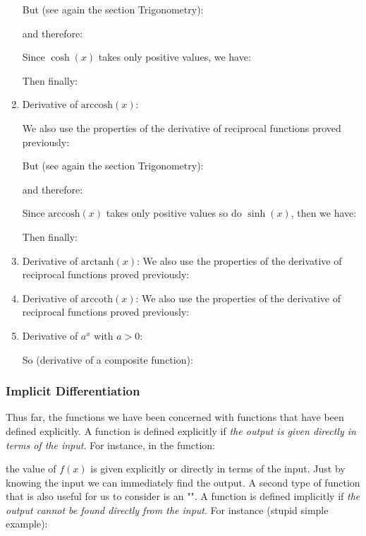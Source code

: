 \begin{enumerate}
		 	But (see again the section Trigonometry):
		 	
		 	and therefore:
		 	
		 	Since $\cosh(x)$ takes only positive values, we have:
		 	
		 	Then finally:
		 	
		 	\item Derivative of $\text{arccosh}(x)$:
		 	
		 	We also use the properties of the derivative of reciprocal functions proved previously:
		 	
		 	But (see again the section Trigonometry):
		 	
		 	and therefore:
		 	
		 	Since $\text{arccosh}(x)$ takes only positive values so do $\sinh(x)$, then we have:
		 	
		 	Then finally:
		 	
		 	\item Derivative of $\text{arctanh}(x)$:
		 	We also use the properties of the derivative of reciprocal functions proved previously:
		 	
		 	\item Derivative of $\text{arccoth}(x)$:
		 	We also use the properties of the derivative of reciprocal functions proved previously:
		 	
		 	\item Derivative of $a^x$ with $a>0$:
		 	
		 	So (derivative of a composite function):
		 	
		 \end{enumerate}
		 
		 \pagebreak
		\subsubsection{Implicit Differentiation}
	Thus far, the functions we have been concerned with functions that have been defined explicitly. A function is defined explicitly if {\it the output is given directly in terms of the input}. For instance, in the function:
		
	the value of $f(x)$ is given explicitly or directly in terms of the input. Just by knowing the input we can immediately find the output. A second type of function that is also useful for us to consider is an "". A function is defined implicitly if {\it the output cannot be found directly from the input}. For instance (stupid simple example):
	
